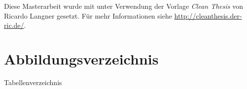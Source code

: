 
{%
\renewcommand{\bibfont}{\normalfont\small}
\setlength{\biblabelsep}{0pt}
\setlength{\bibitemsep}{0.5\baselineskip plus 0.5\baselineskip}
\printbibliography
}

\vfill

Diese Masterarbeit wurde mit \LaTeXe unter Verwendung der Vorlage \textit{Clean Thesis} von Ricardo Langner gesetzt.
Für mehr Informationen siehe \url{http://cleanthesis.der-ric.de/}.

\chapter*{Abbildungsverzeichnis}
\renewcommand\listfigurename{}
\vspace*{-2.35cm}
\listoffigures


{ Tabellenverzeichnis}
\renewcommand\listtablename{}
\vspace*{-2.35cm}
\listoftables


\renewcommand\listalgorithmname{Algorithmenverzeichnis}
\listofalgorithms
\cleardoublepage


